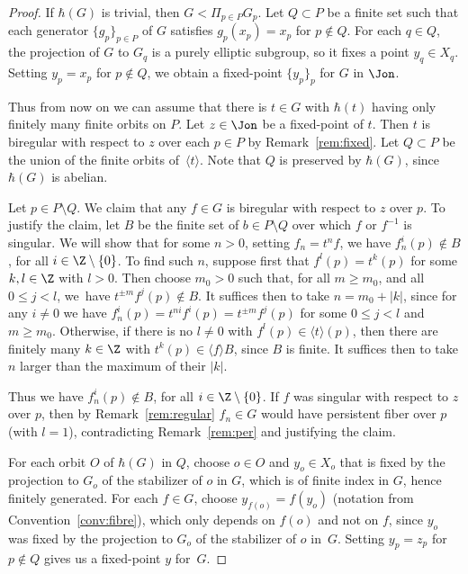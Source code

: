 \begin{proof} If $\hbar(G)$ is trivial, then $G<\Pi_{p\in P} G_p$. Let $Q\subset P$ be a finite set such that each generator $\{g_p\}_{p\in P}$ of $G$ satisfies $g_p(x_p)=x_p$ for $p\notin Q$. For each $q\in Q$, the projection of $G$ to $G_q$ is a purely elliptic subgroup, so it fixes a point $y_q\in X_q$. Setting $y_p=x_p$ for $p\notin Q$, we obtain a fixed-point $\{y_p\}_p$ for $G$ in $\Jon$.

Thus from now on we can assume that there is $t\in G$ with $\hbar(t)$ having only finitely many finite orbits on $P$. Let $z\in \Jon$ be a fixed-point of $t$. Then $t$ is biregular with respect to $z$ over each $p\in P$ {by Remark~\ref{rem:fixed}}.
Let $Q\subset P$ be the union of the finite orbits of~$\langle t\rangle$. Note that $Q$ is preserved by $\hbar(G)$, since $\hbar(G)$ is abelian.

Let $p\in P\setminus Q$. We claim that any $f\in G$ is biregular with respect to $z$ over $p$.
To justify the claim, let $B$ be the finite set of $b\in P\setminus Q$ over which $f$ or $f^{-1}$ is singular. We will show that for some $n>0$, setting $f_n=t^nf$, we have $f_n^i(p)\notin B$, for all $i \in \Z\setminus \{0\}$.
To find such $n$, suppose first that $f^l(p)=t^k(p)$ for some $k,l\in \Z$ with $l> 0$. Then choose $m_0>0$ such that, for all $m\geq m_0$, and all $0\leq j<l$, we~have $t^{\pm m}f^j(p)\notin B$. It suffices then to take $n=m_0+|k|$,
since for any $i\neq 0$ we have $f_n^i(p)=t^{ni}f^i(p)=t^{\pm m}f^j(p)$ for some $0\leq j<l$ and $m\geq m_0$. Otherwise, if there is no $l\neq 0$ with $f^l(p)\in \langle t \rangle(p)$, then
there are finitely many $k\in \Z$ with $t^k(p)\in \langle f\rangle B$, since $B$ is finite. It suffices then to take $n$ larger than the maximum of their $|k|$.

Thus we have $f_n^i(p)\notin B$, for all $i \in \Z\setminus \{0\}$. If $f$ was singular with respect to $z$ over $p$, then by Remark~\ref{rem:regular} $f_n\in G$ would have persistent fiber over $p$ (with $l=1$), contradicting Remark~\ref{rem:per} and justifying the claim.

For each orbit $O$ of $\hbar(G)$ in $Q$, choose $o\in O$ and $y_o\in X_o$ that is fixed by the projection to $G_o$ of the stabilizer of $o$ in $G$, which is of finite index in $G$, hence finitely generated. For each $f\in G$, choose $y_{f(o)}=f(y_o)$ (notation from Convention~\ref{conv:fibre}),
which only depends on $f(o)$ and not on $f$, since $y_o$ was fixed by the projection to $G_o$ of the stabilizer of $o$ in~$G$.
Setting $y_p=z_p$ for $p\notin Q$ gives us a fixed-point $y$ for~$G$.
\end{proof}

